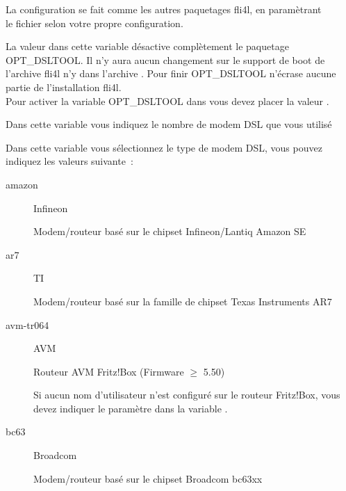   La configuration se fait comme les autres paquetages fli4l, en paramètrant\\
  le fichier  selon votre
  propre configuration.

\begin{description}


  La valeur  dans cette variable désactive complètement le paquetage
  OPT\_DSLTOOL. Il n'y aura aucun changement sur le support de boot de l'archive
  fli4l  n'y dans l'archive . Pour finir OPT\_DSLTOOL
  n'écrase aucune partie de l'installation fli4l.\\
  Pour activer la variable OPT\_DSLTOOL dans  vous devez
  placer la valeur .


  Dans cette variable vous indiquez le nombre de modem DSL que vous utilisé


  Dans cette variable vous sélectionnez le type de modem DSL, vous pouvez
  indiquez les valeurs suivante~:

\begin{description}

\item[amazon] Infineon 

  Modem/routeur basé sur le chipset Infineon/Lantiq Amazon SE

\item[ar7] TI 

  Modem/routeur basé sur la famille de chipset Texas Instruments AR7

\item[avm-tr064] AVM 

  Routeur AVM Fritz!Box (Firmware $\ge$ 5.50)

  Si aucun nom d'utilisateur n'est configuré sur le routeur Fritz!Box,
  vous devez indiquer le paramètre  dans la variable
  .

\item[bc63] Broadcom 

  Modem/routeur basé sur le chipset Broadcom bc63xx


\end{description}
\end{description}
